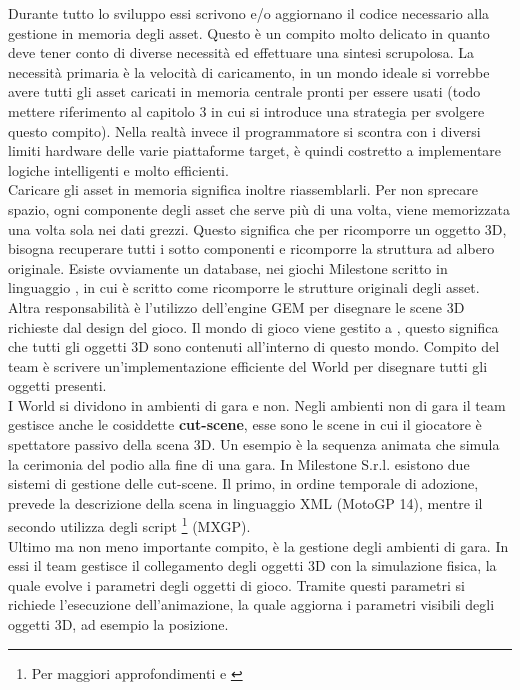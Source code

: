 Durante tutto lo sviluppo essi scrivono e/o aggiornano il codice necessario alla gestione in memoria degli asset. Questo è un compito molto delicato in quanto deve tener conto di diverse necessità ed effettuare una sintesi scrupolosa. La necessità primaria è la velocità di caricamento, in un mondo ideale si vorrebbe avere tutti gli asset caricati in memoria centrale pronti per essere usati (todo mettere riferimento al capitolo 3 in cui si introduce una strategia per svolgere questo compito). Nella realtà invece il programmatore si scontra con i diversi limiti hardware delle varie piattaforme target, è quindi costretto a implementare logiche intelligenti e molto efficienti.\\

Caricare gli asset in memoria significa inoltre riassemblarli. Per non sprecare spazio, ogni componente degli asset che serve più di una volta, viene memorizzata una volta sola nei dati grezzi. Questo significa che per ricomporre un oggetto 3D, bisogna recuperare tutti i sotto componenti e ricomporre la struttura ad albero originale. Esiste ovviamente un database, nei giochi Milestone scritto in linguaggio , in cui è scritto come ricomporre le strutture originali degli asset.\\

Altra responsabilità è l'utilizzo dell'engine GEM per disegnare le scene 3D richieste dal design del gioco. Il mondo di gioco viene gestito a , questo significa che tutti gli oggetti 3D sono contenuti all'interno di questo mondo. Compito del team è scrivere un'implementazione efficiente del World per disegnare tutti gli oggetti presenti.\\

I World si dividono in ambienti di gara e non. Negli ambienti non di gara il team gestisce anche le cosiddette \textbf{cut-scene}, esse sono le scene in cui il giocatore è spettatore passivo della scena 3D. Un esempio è la sequenza animata che simula la cerimonia del podio alla fine di una gara. In Milestone S.r.l. esistono due sistemi di gestione delle cut-scene. Il primo, in ordine temporale di adozione, prevede la descrizione della scena in linguaggio XML (MotoGP 14), mentre il secondo utilizza degli script \footnote{Per maggiori approfondimenti \cite{inbook:game-coding-complete} e \cite{site:lua-paper}} (MXGP).\\

Ultimo ma non meno importante compito, è la gestione degli ambienti di gara. In essi il team gestisce il collegamento degli oggetti 3D con la simulazione fisica, la quale evolve i parametri degli oggetti di gioco. Tramite questi parametri si richiede l'esecuzione dell'animazione, la quale aggiorna i parametri visibili degli oggetti 3D, ad esempio la posizione.\\

